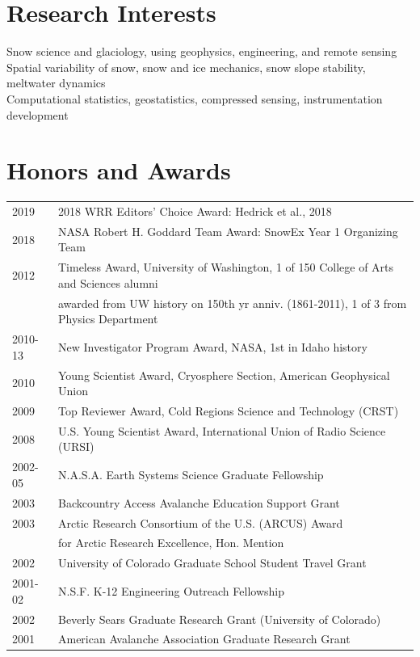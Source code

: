 \documentclass[11pt]{article}
\begin{document}
\pagebreak

\section*{Research Interests}
Snow science and glaciology, using geophysics, engineering, and remote sensing \\
Spatial variability of snow, snow and ice mechanics, snow slope stability, meltwater dynamics \\
Computational statistics, geostatistics, compressed sensing, instrumentation development \\

\section*{Honors and Awards}
\begin{tabular}{ll}
2019 & 2018 WRR Editors' Choice Award: Hedrick et al., 2018 \\
2018 & NASA Robert H. Goddard Team Award: SnowEx Year 1 Organizing Team \\
2012 & Timeless Award, University of Washington, 1 of 150 College of Arts and Sciences alumni  \\
& awarded from UW history on 150th yr anniv. (1861-2011), 1 of 3 from Physics Department \\
2010-13 & New Investigator Program Award, NASA, 1st in Idaho history \\
2010 & Young Scientist Award, Cryosphere Section, American Geophysical Union \\
2009 & Top Reviewer Award, Cold Regions Science and Technology (CRST) \\
2008 & U.S. Young Scientist Award, International Union of Radio Science (URSI) \\
2002-05 & N.A.S.A. Earth Systems Science Graduate Fellowship \\
2003 & Backcountry Access Avalanche Education Support Grant \\
2003 & Arctic Research Consortium of the U.S. (ARCUS) Award \\
& for Arctic Research Excellence, Hon. Mention \\
2002 & University of Colorado Graduate School Student Travel Grant \\
2001-02 & N.S.F. K-12 Engineering Outreach Fellowship \\
2002 & Beverly Sears Graduate Research Grant (University of Colorado) \\
2001 & American Avalanche Association Graduate Research Grant \\

\end{tabular}
\end{document}
